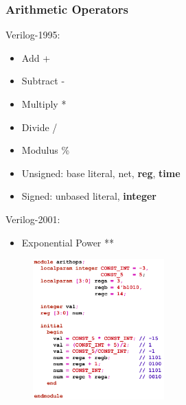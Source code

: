 \documentclass[t, notes, xcolor=table]{beamer}
\begin{document}
\begin{frame}
\frametitle{Arithmetic Operators}
\scriptsize{
\begin{multicols}{2}
Verilog-1995:
\begin{itemize}
\item Add +
\item Subtract -
\item Multiply *
\item Divide /
\item Modulus \%
\item Unsigned: base literal, net, \textbf{reg}, \textbf{time}
\item Signed: unbased literal, \textbf{integer}
\end{itemize}
Verilog-2001:
\begin{itemize}
\item Exponential Power **
\end{itemize}
\vfill
\columnbreak
\begin{figure}
    \includegraphics[width=0.45\textwidth]{img/05_arith.png}
\end{figure}
\end{multicols}
}
\end{frame}
\end{document}
